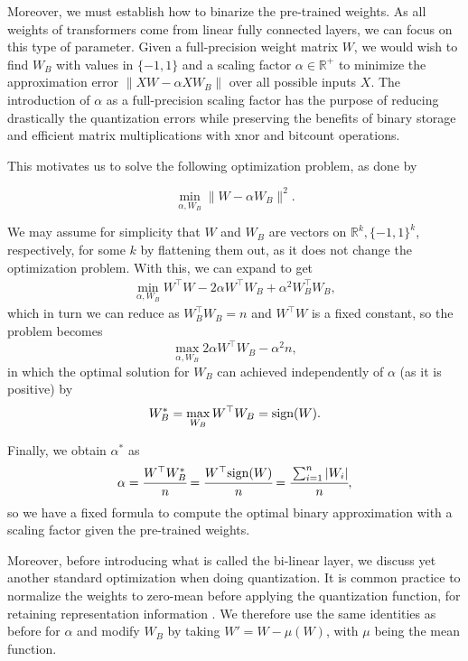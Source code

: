 Moreover, we must establish how to binarize the pre-trained weights. As all weights of transformers come from linear fully connected layers, we can focus on this type of parameter. Given a full-precision weight matrix $W$, we would wish to find $W_B$ with values in $\{-1, 1\}$ and a scaling factor $\alpha \in \mathbb{R}^+$ to minimize the approximation error $\|XW - \alpha XW_B \|$ over all possible inputs $X$. The introduction of $\alpha$ as a full-precision scaling factor has the purpose of reducing drastically the quantization errors \cite{rastegari2016xnornet} while preserving the benefits of binary storage and efficient matrix multiplications with xnor and bitcount operations.

This motivates us to solve the following optimization problem, as done by \cite{rastegari2016xnornet} 

\begin{equation}
\label{eq:optim_bin}
    \min_{\alpha, W_B} \| W - \alpha W_B \|^2.
\end{equation}

We may assume for simplicity that $W$ and $W_B$ are vectors on $\mathbb{R}^k, \{-1, 1\}^k$, respectively, for some $k$ by flattening them out, as it does not change the optimization problem. With this, we can expand to get
\begin{align}
    \min_{\alpha, W_B} W^\top W - 2\alpha W^\top W_B + \alpha^2 W_B^\top W_B,
\end{align}
which in turn we can reduce as $W_B^\top W_B = n$ and $W^\top W$ is a fixed constant, so the problem becomes
\begin{equation}
    \max_{\alpha, W_B} 2\alpha W^\top W_B - \alpha^2 n,
\end{equation}
in which the optimal solution for $W_B$ can achieved independently of $\alpha$ (as it is positive) by 
\begin{equation}
    W_B^* = \max_{W_B} W^\top W_B = \text{sign}(W).
\end{equation}

Finally, we obtain $\alpha^*$ as 
\begin{equation}
    \alpha = \cfrac{W^\top W_B^*}{n} = \cfrac{W^\top \text{sign}(W)}{n} = \cfrac{\sum_{i=1}^n |W_i|}{n},
\end{equation}
so we have a fixed formula to compute the optimal binary approximation with a scaling factor given the pre-trained weights. 

Moreover, before introducing what is called the bi-linear layer, we discuss yet another standard optimization when doing quantization. It is common practice to normalize the weights to zero-mean before applying the quantization function, for retaining representation information \cite{qin2020forward}. We therefore use the same identities as before for $\alpha$ and modify $W_B$ by taking $W' = W - \mu(W)$, with $\mu$ being the mean function.

